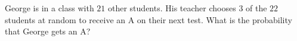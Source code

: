 George is in a class with $21$ other students. His teacher chooses $3$ of the $22$ students at random to receive an A on their next test. What is the probability that George gets an A?
